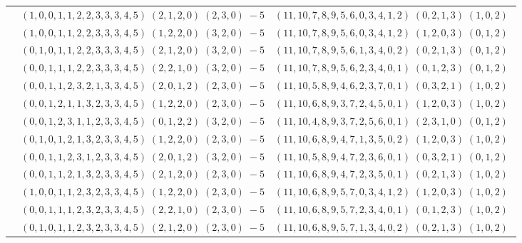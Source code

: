 \documentclass[11pt]{article}
\begin{document}
\begin{longtable}[l]{|c|c|c|}
 \cline{2-3} 
 & $(1 ,0 ,0 ,1 ,1 ,2 ,2 ,3 ,3 ,3 ,4 ,5) \;(2 ,1 ,2 ,0) \;(2 ,3 ,0) \;-5$ & $(11 ,10 ,7 ,8 ,9 ,5 ,6 ,0 ,3 ,4 ,1 ,2) \;(0 ,2 ,1 ,3) \;(1 ,0 ,2) \;$\\ 
 \cline{2-3} 
 & $(1 ,0 ,0 ,1 ,1 ,2 ,2 ,3 ,3 ,3 ,4 ,5) \;(1 ,2 ,2 ,0) \;(3 ,2 ,0) \;-5$ & $(11 ,10 ,7 ,8 ,9 ,5 ,6 ,0 ,3 ,4 ,1 ,2) \;(1 ,2 ,0 ,3) \;(0 ,1 ,2) \;$\\ 
 \cline{2-3} 
 & $(0 ,1 ,0 ,1 ,1 ,2 ,2 ,3 ,3 ,3 ,4 ,5) \;(2 ,1 ,2 ,0) \;(3 ,2 ,0) \;-5$ & $(11 ,10 ,7 ,8 ,9 ,5 ,6 ,1 ,3 ,4 ,0 ,2) \;(0 ,2 ,1 ,3) \;(0 ,1 ,2) \;$\\ 
 \cline{2-3} 
 & $(0 ,0 ,1 ,1 ,1 ,2 ,2 ,3 ,3 ,3 ,4 ,5) \;(2 ,2 ,1 ,0) \;(3 ,2 ,0) \;-5$ & $(11 ,10 ,7 ,8 ,9 ,5 ,6 ,2 ,3 ,4 ,0 ,1) \;(0 ,1 ,2 ,3) \;(0 ,1 ,2) \;$\\ 
 \cline{2-3} 
 & $(0 ,0 ,1 ,1 ,2 ,3 ,2 ,1 ,3 ,3 ,4 ,5) \;(2 ,0 ,1 ,2) \;(2 ,3 ,0) \;-5$ & $(11 ,10 ,5 ,8 ,9 ,4 ,6 ,2 ,3 ,7 ,0 ,1) \;(0 ,3 ,2 ,1) \;(1 ,0 ,2) \;$\\ 
 \cline{2-3} 
 & $(0 ,0 ,1 ,2 ,1 ,1 ,3 ,2 ,3 ,3 ,4 ,5) \;(1 ,2 ,2 ,0) \;(2 ,3 ,0) \;-5$ & $(11 ,10 ,6 ,8 ,9 ,3 ,7 ,2 ,4 ,5 ,0 ,1) \;(1 ,2 ,0 ,3) \;(1 ,0 ,2) \;$\\ 
 \cline{2-3} 
 & $(0 ,0 ,1 ,2 ,3 ,1 ,1 ,2 ,3 ,3 ,4 ,5) \;(0 ,1 ,2 ,2) \;(3 ,2 ,0) \;-5$ & $(11 ,10 ,4 ,8 ,9 ,3 ,7 ,2 ,5 ,6 ,0 ,1) \;(2 ,3 ,1 ,0) \;(0 ,1 ,2) \;$\\ 
 \cline{2-3} 
 & $(0 ,1 ,0 ,1 ,2 ,1 ,3 ,2 ,3 ,3 ,4 ,5) \;(1 ,2 ,2 ,0) \;(2 ,3 ,0) \;-5$ & $(11 ,10 ,6 ,8 ,9 ,4 ,7 ,1 ,3 ,5 ,0 ,2) \;(1 ,2 ,0 ,3) \;(1 ,0 ,2) \;$\\ 
 \cline{2-3} 
 & $(0 ,0 ,1 ,1 ,2 ,3 ,1 ,2 ,3 ,3 ,4 ,5) \;(2 ,0 ,1 ,2) \;(3 ,2 ,0) \;-5$ & $(11 ,10 ,5 ,8 ,9 ,4 ,7 ,2 ,3 ,6 ,0 ,1) \;(0 ,3 ,2 ,1) \;(0 ,1 ,2) \;$\\ 
 \cline{2-3} 
 & $(0 ,0 ,1 ,1 ,2 ,1 ,3 ,2 ,3 ,3 ,4 ,5) \;(2 ,1 ,2 ,0) \;(2 ,3 ,0) \;-5$ & $(11 ,10 ,6 ,8 ,9 ,4 ,7 ,2 ,3 ,5 ,0 ,1) \;(0 ,2 ,1 ,3) \;(1 ,0 ,2) \;$\\ 
 \cline{2-3} 
 & $(1 ,0 ,0 ,1 ,1 ,2 ,3 ,2 ,3 ,3 ,4 ,5) \;(1 ,2 ,2 ,0) \;(2 ,3 ,0) \;-5$ & $(11 ,10 ,6 ,8 ,9 ,5 ,7 ,0 ,3 ,4 ,1 ,2) \;(1 ,2 ,0 ,3) \;(1 ,0 ,2) \;$\\ 
 \cline{2-3} 
 & $(0 ,0 ,1 ,1 ,1 ,2 ,3 ,2 ,3 ,3 ,4 ,5) \;(2 ,2 ,1 ,0) \;(2 ,3 ,0) \;-5$ & $(11 ,10 ,6 ,8 ,9 ,5 ,7 ,2 ,3 ,4 ,0 ,1) \;(0 ,1 ,2 ,3) \;(1 ,0 ,2) \;$\\ 
 \cline{2-3} 
 & $(0 ,1 ,0 ,1 ,1 ,2 ,3 ,2 ,3 ,3 ,4 ,5) \;(2 ,1 ,2 ,0) \;(2 ,3 ,0) \;-5$ & $(11 ,10 ,6 ,8 ,9 ,5 ,7 ,1 ,3 ,4 ,0 ,2) \;(0 ,2 ,1 ,3) \;(1 ,0 ,2) \;$\\ 

\end{longtable}
\end{document}
